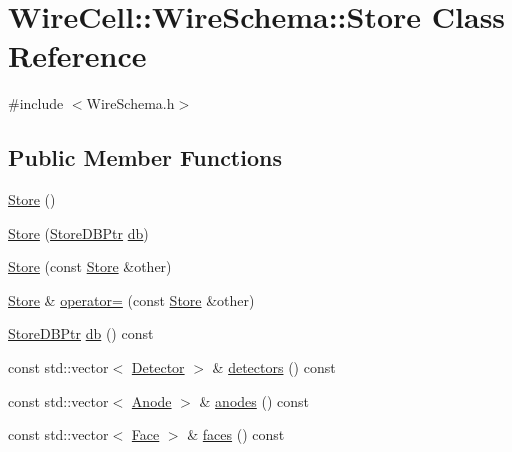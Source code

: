\hypertarget{class_wire_cell_1_1_wire_schema_1_1_store}{}\section{Wire\+Cell\+:\+:Wire\+Schema\+:\+:Store Class Reference}
\label{class_wire_cell_1_1_wire_schema_1_1_store}


{\ttfamily \#include $<$Wire\+Schema.\+h$>$}

\subsection*{Public Member Functions}
\begin{DoxyCompactItemize}
\item 
\hyperlink{class_wire_cell_1_1_wire_schema_1_1_store_a5f58eadcb7385d5a5aa6830daef84f7d}{Store} ()
\item 
\hyperlink{class_wire_cell_1_1_wire_schema_1_1_store_abedb7f146845049bdd5963be7838d6ec}{Store} (\hyperlink{namespace_wire_cell_1_1_wire_schema_a9b93b8d397f153737ab0ba52066308e2}{Store\+D\+B\+Ptr} \hyperlink{class_wire_cell_1_1_wire_schema_1_1_store_aa81035f87804b21da2d018194eed8d85}{db})
\item 
\hyperlink{class_wire_cell_1_1_wire_schema_1_1_store_a2db7fe64036c4aeeb1f153eb8e2b9448}{Store} (const \hyperlink{class_wire_cell_1_1_wire_schema_1_1_store}{Store} \&other)
\item 
\hyperlink{class_wire_cell_1_1_wire_schema_1_1_store}{Store} \& \hyperlink{class_wire_cell_1_1_wire_schema_1_1_store_aaffe7ef01a51fac30565a9d537becba2}{operator=} (const \hyperlink{class_wire_cell_1_1_wire_schema_1_1_store}{Store} \&other)
\item 
\hyperlink{namespace_wire_cell_1_1_wire_schema_a9b93b8d397f153737ab0ba52066308e2}{Store\+D\+B\+Ptr} \hyperlink{class_wire_cell_1_1_wire_schema_1_1_store_aa81035f87804b21da2d018194eed8d85}{db} () const
\item 
const std\+::vector$<$ \hyperlink{struct_wire_cell_1_1_wire_schema_1_1_detector}{Detector} $>$ \& \hyperlink{class_wire_cell_1_1_wire_schema_1_1_store_ae758694bfc0ca7fbdb51982b362c0c8c}{detectors} () const
\item 
const std\+::vector$<$ \hyperlink{struct_wire_cell_1_1_wire_schema_1_1_anode}{Anode} $>$ \& \hyperlink{class_wire_cell_1_1_wire_schema_1_1_store_ae6049110bb1bd50009b1f9cf59b25557}{anodes} () const
\item 
const std\+::vector$<$ \hyperlink{struct_wire_cell_1_1_wire_schema_1_1_face}{Face} $>$ \& \hyperlink{class_wire_cell_1_1_wire_schema_1_1_store_af499deefaf681bf7cb59cb564250504f}{faces} () const

\end{DoxyCompactItemize}
